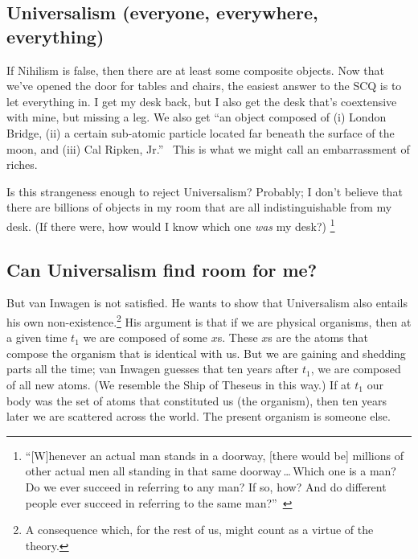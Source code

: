 \documentclass[11pt]{article}
\begin{document}
\begin{spacing}{1.5}
\section{Universalism (everyone, everywhere, everything)}
If Nihilism is false, then there are at least some composite objects. Now that we've opened the door for tables and chairs, the easiest answer to the SCQ is to let everything in. I get my desk back, but I also get the desk that's coextensive with mine, but missing a leg. We also get ``an object composed of (i) London Bridge, (ii) a certain sub-atomic particle located far beneath the surface of the moon, and (iii) Cal Ripken, Jr.''~\citep[228]{markosian1998a} %
This is what we might call an embarrassment of riches.

Is this strangeness enough to reject Universalism? Probably; I don't believe that there are billions of objects in my room that are all indistinguishable from my desk. (If there were, how would I know which one {\em was} my desk?)%
\footnote{``[W]henever an actual man stands in a doorway, [there would be] millions of other actual men all standing in that same doorway\,\ldots\,Which one is a man? Do we ever succeed in referring to any man? If so, how? And do different people ever succeed in referring to the same man?''~\citep[241--242]{markosian1998a}}

\subsection{Can Universalism find room for me?}
But van Inwagen is not satisfied. He wants to show that Universalism also entails his own non-existence.\footnote{A consequence which, for the rest of us, might count as a virtue of the theory.} His argument is that if we are physical organisms, then at a given time $t_{1}$ we are composed of some $x$s. These $x$s are the atoms that compose the organism that is identical with us. But we are gaining and shedding parts all the time; van Inwagen guesses that ten years after $t_{1}$, we are composed of all new atoms. (We resemble the Ship of Theseus in this way.) If at $t_{1}$ our body was the set of atoms that constituted us (the organism), then ten years later we are scattered across the world. The present organism is someone else.


\end{spacing}
\end{document}
